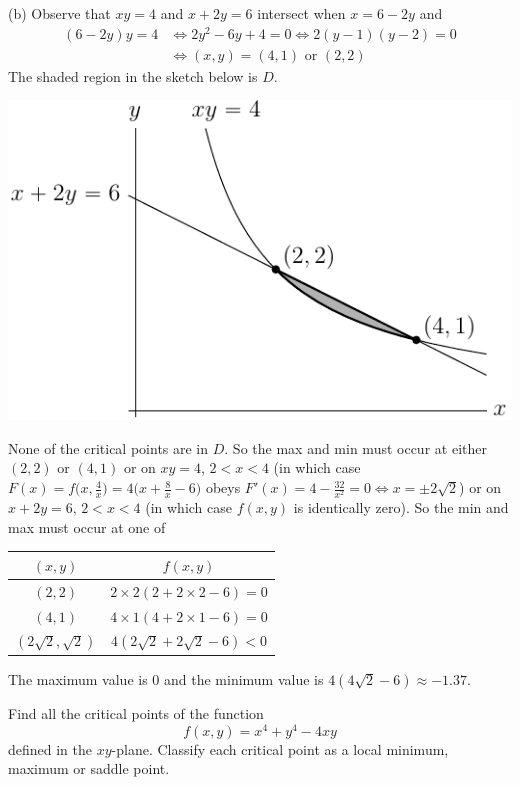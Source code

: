\begin{solution}
(b) Observe that $xy=4$ and $x+2y=6$ intersect when $x=6-2y$ and
\begin{align*}
(6-2y)y=4
&\iff 2y^2-6y+4=0
\iff 2(y-1)(y-2)=0 \\
&\iff (x,y) = (4,1)\text{ or }(2,2)
\end{align*}
The shaded region in the sketch below is $D$.
\begin{center}
     \includegraphics{fig/OE03AQ3.pdf}
\end{center}
None of the critical points are in $D$. So the max and min must occur
at either $(2,2)$ or $(4,1)$ or on $xy=4$, $2<x<4$ (in which case
$F(x)=f\big(x,\frac{4}{x}\big)=4\big(x+\frac{8}{x}-6)$ obeys
$F'(x)=4-\frac{32}{x^2}=0\iff x=\pm2\sqrt{2}$) or on
$x+2y=6$, $2<x<4$ (in which case $f(x,y)$ is identically zero). So the
min and max must occur at one of 
\begin{center}
\renewcommand{\arraystretch}{1.3}
     \begin{tabular}{|c|c|}
     \hline
       $(x,y)$  & $f(x,y)$ \\ \hline
       $(2,2)$  & $2\times 2(2+2\times2-6)=0$ \\ \hline
       $(4,1)$  & $4\times 1(4+2\times 1-6)=0$ \\ \hline
       $(2\sqrt{2},\sqrt{2})$ & $4(2\sqrt{2}+2\sqrt{2}-6)<0$ \\ \hline 
     \end{tabular}
\renewcommand{\arraystretch}{1.0}
\end{center}
The maximum value is $0$ and the minimum value is $4(4\sqrt{2}-6)
\approx -1.37$.
\end{solution}

\begin{question} [M200 2002D] %
Find all the critical points of the function 
\begin{equation*}
f(x,y)=x^4+y^4-4xy
\end{equation*}
defined in the $xy$-plane. Classify each critical point as a local minimum, 
maximum or saddle point.
\end{question}

